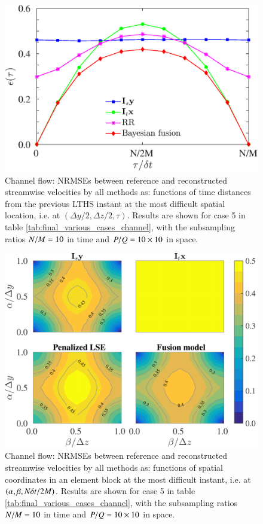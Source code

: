 \begin{figure}
\begin{center}
\includegraphics[width = 0.8\columnwidth]{./images/comparisons/channel/error_MAP_newOM1_middlepoint_outer.eps}
\caption{\label{fig:final_channel_error_time} Channel flow: NRMSEs between reference and reconstructed streamwise velocities by all methods as: functions of time distances from the previous LTHS instant at the most difficult spatial location, i.e. at $ (\Delta y/2,\Delta z/2,\tau) $. Results are shown for case 5 in table \ref{tab:final_various_cases_channel}, with the subsampling ratios $ N/M = 10 $ in time and $ P/Q = 10 \times 10 $ in space.}
\end{center}
\end{figure}

\begin{figure}
\begin{center}
\includegraphics[width = 0.8\columnwidth]{./images/comparisons/channel/error_MAP_newOM1_boxin4HWs_outer.png}
\caption{\label{fig:final_channel_error_boxes} Channel flow: NRMSEs between reference and reconstructed streamwise velocities by all methods as: functions of spatial coordinates in an element block at the most difficult instant, i.e. at $ (\alpha,\beta,N \delta t/2M) $. Results are shown for case 5 in table \ref{tab:final_various_cases_channel}, with the subsampling ratios $ N/M = 10 $ in time and $ P/Q = 10 \times 10 $ in space.}
\end{center}
\end{figure}



